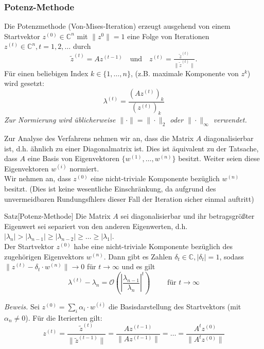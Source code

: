 \documentclass{article}
\begin{document}
    \subsubsection{Potenz-Methode}
    \begin{defbox}
        Die Potenzmethode (Von-Mises-Iteration) erzeugt ausgehend von einem Startvektor $z^{(0)}\in\mathbb{C}^n$ mit
        $\|z^0\|=1$ eine Folge von Iterationen $z^{(t)}\in\mathbb{C}^n, t=1,2,\dotsc$ durch 
        \[\tilde{z}^{(t)}=Az^{(t-1)} \quad\text{und}\quad z^{(t)} = \tfrac{\tilde{z}^{(t)}}{\|\tilde{z}^{(t)}\|}.\]
        Für einen beliebigen  Index $k\in\{1,\dotsc,n\}$, (z.B. maximale Komponente von $z^k$) wird gesetzt:
        \[\lambda^{(t)} = \dfrac{(Az^{(t)})_k}{(z^{(t)})_k}\]
        \textit{Zur Normierung wird üblicherweise $\|\cdot\|=\|\cdot\|_2$ oder $\|\cdot\|_\infty$ verwendet.} 
    \end{defbox}
    Zur Analyse des Verfahrens nehmen wir an, dass die Matrix $A$ diagonalisierbar ist, d.h. ähnlich zu einer 
    Diagonalmatrix ist. Dies ist äquivalent zu der Tatsache, dass $A$ eine Basis von Eigenvektoren 
    $\{w^{(1)},\dotsc,w^{(n)}\}$ besitzt. Weiter seien diese Eigenvektoren $w^{(i)}$ normiert. \\
    Wir nehmen an, dass $z^{(0)}$ eine nicht-triviale Komponente bezüglich $w^{(n)}$ besitzt. 
    (Dies ist keine wesentliche Einschränkung, da aufgrund des unvermeidbaren Rundungsfhlers dieser Fall der 
    Iteration sicher einmal auftritt)
    \begin{thmbox}{Satz}[Potenz-Methode]
        Die Matrix $A$ sei diagonalisierbar und ihr betragsgrößter Eigenwert sei separiert von den anderen 
        Eigenwerten, d.h. $|\lambda_n|>|\lambda_{n-1}|\geq|\lambda_{n-2}|\geq\dotsc\geq|\lambda_1|$. \\ 
        Der Startvektor $z^{(0)}$ habe eine nicht-triviale Komponente bezüglich des zugehörigen Eigenvektors $w^{(n)}$.
        Dann gibt es Zahlen $\delta_t\in\mathbb{C}, |\delta_t|=1$, 
        sodass $\|z^{(t)}-\delta_t\cdot w^{(n)}\|\rightarrow 0$ für $t\rightarrow\infty$ und es gilt
        \[\lambda^{(t)}-\lambda_n = \mathcal{O}\left(\left|\dfrac{\lambda_{n-1}}{\lambda_n}\right|^t\right)\qquad 
        \text{ für } t\rightarrow \infty\]
    \end{thmbox}
    \textit{Beweis.} Sei $z^{(0)}=\sum_i \alpha_i\cdot w^{(i)}$ die Basisdarstellung des Startvektors 
    (mit $\alpha_n\neq 0$). Für die Iterierten gilt:
    \[z^{(t)} = \dfrac{\tilde{z}^{(t)}}{\|\tilde{z}^{(t-1)}\|} = \dfrac{Az^{(t-1)}}{\|Az^{(t-1)}\|} 
    = \dotsc = \dfrac{A^tz^{(0)}}{\|A^tz^{(0)}\|}\]
\end{document}
